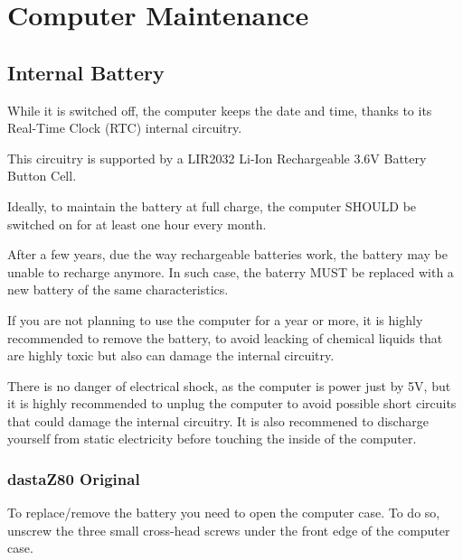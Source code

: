 \section{Computer Maintenance}

    \subsection{Internal Battery}

    While it is switched off, the computer keeps the date and time, thanks to
    its Real-Time Clock (RTC) internal circuitry.

    This circuitry is supported by a LIR2032 Li-Ion Rechargeable 3.6V Battery
    Button Cell.

    Ideally, to maintain the battery at full charge, the computer SHOULD be
    switched on for at least one hour every month.

    After a few years, due the way rechargeable batteries work, the battery may
    be unable to recharge anymore. In such case, the baterry MUST be replaced
    with a new battery of the same characteristics.

    If you are not planning to use the computer for a year or more, it is highly
    recommended to remove the battery, to avoid leacking of chemical liquids
    that are highly toxic but also can damage the internal circuitry.

    There is no danger of electrical shock, as the computer is power just by 5V,
    but it is highly recommended to unplug the computer to avoid possible short
    circuits that could damage the internal circuitry. It is also recommened to
    discharge yourself from static electricity before touching the inside of the
    computer.

        \subsubsection{dastaZ80 Original}

        To replace/remove the battery you need to open the computer case. To do
        so, unscrew the three small cross-head screws under the front edge of
        the computer case.

